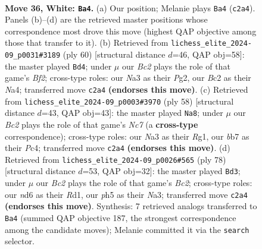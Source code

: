 \documentclass[11pt]{article}
\begin{document}
\clearpage

\begin{figure}[p]\centering
\begin{subfigure}{0.46\textwidth}\centering
\resizebox{\linewidth}{!}{%
\newchessgame
\chessboard[
  setfen={r7/pbpp4/1p1n2k1/5p1p/1PP2P2/N7/P1BPK2P/R7 w - - 1 36},
  showmover=false,
  pgfstyle=straightmove, color=movearrow, markmove={c2-a4}
]}
\caption{}
\end{subfigure}\hfill
\begin{subfigure}{0.46\textwidth}\centering
\resizebox{\linewidth}{!}{%
\newchessgame
\chessboard[
  setfen={1r6/k5p1/1p2p2p/p2b1p2/N7/P4P2/1PPK1BPP/8 w - - 1 31},
  showmover=false,
  pgfstyle=straightmove, color=movearrow, markmove={f2-d4}
]}
\caption{}
\end{subfigure}
\\[4pt]
\begin{subfigure}{0.46\textwidth}\centering
\resizebox{\linewidth}{!}{%
\newchessgame
\chessboard[
  setfen={2b4r/2N2k1p/1p2p1n1/p3p3/2P3B1/P3P3/KP6/6R1 w - - 3 30},
  showmover=false,
  pgfstyle=straightmove, color=movearrow, markmove={c7-a8}
]}
\caption{}
\end{subfigure}\hfill
\begin{subfigure}{0.46\textwidth}\centering
\resizebox{\linewidth}{!}{%
\newchessgame
\chessboard[
  setfen={8/1p1b4/1nk5/p3rp1p/6p1/N1P3P1/P1B2P1P/3R1K2 w - - 0 40},
  showmover=false,
  pgfstyle=straightmove, color=movearrow, markmove={c2-d3}
]}
\caption{}
\end{subfigure}
\caption{\textbf{Move 36, White: \texttt{Ba4}.} (a) Our position; Melanie plays \texttt{Ba4} (\texttt{c2a4}). Panels (b)--(d) are the retrieved master positions whose correspondence most drove this move (highest QAP objective among those that transfer to it). (b) Retrieved from \texttt{lichess\_elite\_2024-09\_p0031\#3189} (ply 60) [structural distance $d$=46, QAP obj=58]: the master played \texttt{Bd4}; under $\mu$ our \emph{Bc2} plays the role of that game's \emph{Bf2}; cross-type roles: our \emph{N}a3 as their \emph{P}g2, our \emph{B}c2 as their \emph{N}a4; transferred move \texttt{c2a4} \textbf{(endorses this move)}. (c) Retrieved from \texttt{lichess\_elite\_2024-09\_p0003\#3970} (ply 58) [structural distance $d$=43, QAP obj=43]: the master played \texttt{Na8}; under $\mu$ our \emph{Bc2} plays the role of that game's \emph{Nc7} (a \textbf{cross-type} correspondence); cross-type roles: our \emph{N}a3 as their \emph{R}g1, our \emph{b}b7 as their \emph{P}c4; transferred move \texttt{c2a4} \textbf{(endorses this move)}. (d) Retrieved from \texttt{lichess\_elite\_2024-09\_p0026\#565} (ply 78) [structural distance $d$=53, QAP obj=32]: the master played \texttt{Bd3}; under $\mu$ our \emph{Bc2} plays the role of that game's \emph{Bc2}; cross-type roles: our \emph{n}d6 as their \emph{R}d1, our \emph{p}h5 as their \emph{N}a3; transferred move \texttt{c2a4} \textbf{(endorses this move)}. Synthesis: 7 retrieved analogs transferred to \texttt{Ba4} (summed QAP objective 187, the strongest correspondence among the candidate moves); Melanie committed it via the \texttt{search} selector.}
\label{fig:thought-m70}
\end{figure}
\end{document}
